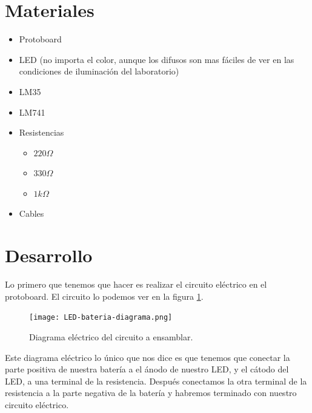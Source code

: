 \documentclass[paper=letter, fontsize=11pt]{scrartcl} %
\numberwithin{equation}{section} %
\numberwithin{figure}{section} %
\numberwithin{table}{section} %
\begin{document}

\section{Materiales}

	\begin{itemize}
		\item Protoboard
		\item LED (no importa el color, aunque los difusos son mas fáciles de ver en las condiciones de iluminación del laboratorio)
		\item LM35
		\item LM741
		\item Resistencias
		\begin{itemize}
			\item $220 \Omega$
			\item $330 \Omega$
			\item $1 k\Omega$
		\end{itemize}
		\item Cables
	\end{itemize}


\section{Desarrollo}

    Lo primero que tenemos que hacer es realizar el circuito eléctrico en el protoboard. El circuito lo podemos ver en la figura \ref{dia:elecir}. \\

    \begin{figure}[h]
    	\begin{center}
    		\texttt{[image: LED-bateria-diagrama.png]} %
    		\caption{Diagrama eléctrico del circuito a ensamblar.}
    		\label{dia:elecir}
    	\end{center}
    \end{figure}

    Este diagrama eléctrico lo único que nos dice es que tenemos que conectar la parte positiva de nuestra batería a el ánodo de nuestro LED, y el cátodo del LED, a una terminal de la resistencia. Después conectamos la otra terminal de la resistencia a la parte negativa de la batería y habremos terminado con nuestro circuito eléctrico. \\
\end{document}
